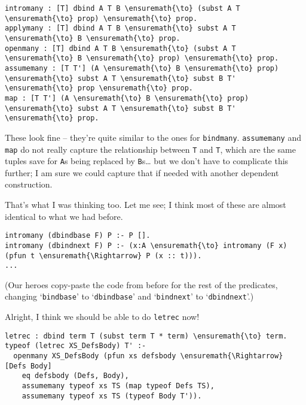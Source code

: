 \begin{verbatim}
intromany : [T] dbind A T B \ensuremath{\to} (subst A T \ensuremath{\to} prop) \ensuremath{\to} prop.
applymany : [T] dbind A T B \ensuremath{\to} subst A T \ensuremath{\to} B \ensuremath{\to} prop.
openmany : [T] dbind A T B \ensuremath{\to} (subst A T \ensuremath{\to} B \ensuremath{\to} prop) \ensuremath{\to} prop.
assumemany : [T T'] (A \ensuremath{\to} B \ensuremath{\to} prop) \ensuremath{\to} subst A T \ensuremath{\to} subst B T' \ensuremath{\to} prop \ensuremath{\to} prop.
map : [T T'] (A \ensuremath{\to} B \ensuremath{\to} prop) \ensuremath{\to} subst A T \ensuremath{\to} subst B T' \ensuremath{\to} prop.
\end{verbatim}

\heroADVISOR{} These look fine -- they're quite similar to the ones for
\texttt{bindmany}. \texttt{assumemany} and \texttt{map} do not really
capture the relationship between \texttt{T} and
\texttt{T\textquotesingle{}}, which are the same tuples save for
\texttt{A}s being replaced by \texttt{B}s\ldots{} but we don't have to
complicate this further; I am sure we could capture that if needed with
another dependent construction.

\heroSTUDENT{} That's what I was thinking too. Let me see; I think most of
these are almost identical to what we had before.

\begin{verbatim}
intromany (dbindbase F) P :- P [].
intromany (dbindnext F) P :- (x:A \ensuremath{\to} intromany (F x) (pfun t \ensuremath{\Rightarrow} P (x :: t))).
...
\end{verbatim}

\begin{scenecomment}
(Our heroes copy-paste the code from before for the rest of the predicates,
changing `\texttt{bindbase}' to `\texttt{dbindbase}' and `\texttt{bindnext}' to `\texttt{dbindnext}'.)
\end{scenecomment}

\heroADVISOR{} Alright, I think we should be able to do \texttt{letrec} now!

\begin{verbatim}
letrec : dbind term T (subst term T * term) \ensuremath{\to} term.
typeof (letrec XS_DefsBody) T' :-
  openmany XS_DefsBody (pfun xs defsbody \ensuremath{\Rightarrow} [Defs Body]
    eq defsbody (Defs, Body),
    assumemany typeof xs TS (map typeof Defs TS),
    assumemany typeof xs TS (typeof Body T')).
\end{verbatim}

